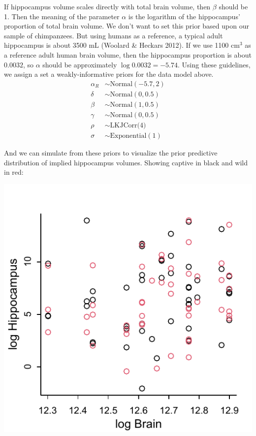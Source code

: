 \documentclass[reqno ,11pt]{amsart}
\begin{document}
If hippocampus volume scales directly with total brain volume, then $\beta$ should be 1. Then the meaning of the parameter $\alpha$ is the logarithm of the hippocampus' proportion of total brain volume. We don't want to set this prior based upon our sample of chimpanzees. But using humans as a reference, a typical adult hippocampus is about 3500 mL (Woolard \& Heckars 2012). If we use 1100 cm$^3$ as a reference adult human brain volume, then the hippocampus proportion is about $0.0032$, so $\alpha$ should be approximately $\log 0.0032 = -5.74$. Using these guidelines, we assign a set a weakly-informative priors for the data model above.
\begin{align*}
\alpha_{R} &\sim \text{Normal}(-5.7,2) \\
\delta &\sim \text{Normal}(0,0.5) \\
\beta &\sim \text{Normal}(1,0.5) \\
\gamma &\sim \text{Normal}(0,0.5) \\
\rho &\sim \text{LKJCorr(4)} \\
\sigma &\sim \text{Exponential}(1)
\end{align*}

And we can simulate from these priors to visualize the prior predictive distribution of implied hippocampus volumes. Showing captive in black and wild in red:
\begin{center}
	\includegraphics[scale=0.7]{fig_prior_pred_m1.pdf}
\end{center}
\end{document}
